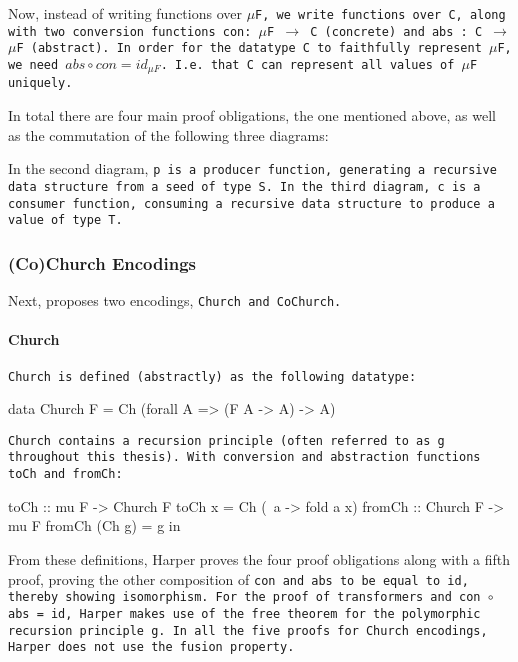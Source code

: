 Now, instead of writing functions over \tt{$\mu$F}, we write functions over \tt{C}, along with two conversion functions \tt{con: $\mu$F $\to$ C} (concrete) and \tt{abs : C $\to$ $\mu$F} (abstract).
In order for the datatype \tt{C} to faithfully represent \tt{$\mu$F}, we need $abs \circ con = id_{\mu F}$. I.e. that \tt{C} can represent all values of \tt{$\mu$F} uniquely.

In total there are four main proof obligations, the one mentioned above, as well as the commutation of the following three diagrams:

\begin{figure}[H]\hfill
{}\hfill\null
{}\hfill\null
{}\hfill\null
\end{figure}

In the second diagram, \tt{p} is a producer function, generating a recursive data structure from a seed of type \tt{S}.
In the third diagram, \tt{c} is a consumer function, consuming a recursive data structure to produce a value of type \tt{T}.

\subsubsection{(Co)Church Encodings}
Next, \cite{Harper2011} proposes two encodings, \tt{Church} and \tt{CoChurch}.

\paragraph{Church} \tt{Church} is defined (abstractly) as the following datatype:
\begin{code}
data Church F = Ch (forall A => (F A -> A) -> A)
\end{code}
\tt{Church} contains a recursion principle (often referred to as \tt{g} throughout this thesis).
With conversion and abstraction functions \tt{toCh} and \tt{fromCh}:
\begin{code}
toCh :: mu F -> Church F
toCh x = Ch (\ a -> fold a x)
fromCh :: Church F -> mu F
fromCh (Ch g) = g in
\end{code}
From these definitions, Harper proves the four proof obligations along with a fifth proof, proving the other composition of \tt{con} and \tt{abs} to be equal to \tt{id}, thereby showing isomorphism.
For the proof of transformers and \tt{con $\circ$ abs = id}, Harper makes use of the free theorem for the polymorphic recursion principle \tt{g}.
In all the five proofs for Church encodings, Harper does not use the fusion property.

